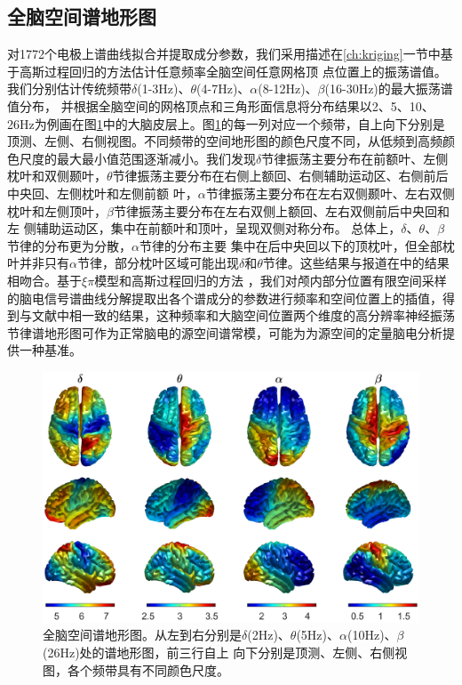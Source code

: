 \subsection{全脑空间谱地形图}
对1772个电极上谱曲线拟合并提取成分参数，我们采用描述在\ref{ch:kriging}一节中基于高斯过程回归的方法估计任意频率全脑空间任意网格顶
点位置上的振荡谱值。我们分别估计传统频带$\delta$(1-3Hz)、$\theta$(4-7Hz)、$\alpha$(8-12Hz)、$\beta$(16-30Hz)的最大振荡谱值分布，
并根据全脑空间的网格顶点和三角形面信息将分布结果以2、5、10、26Hz为例画在图\ref{map}中的大脑皮层上。图\ref{map}的每一列对应一个频带，自上向下分别是顶测、左侧、右侧视图。不同频带的空间地形图的颜色尺度不同，从低频到高频颜色尺度的最大最小值范围逐渐减小。我们发现$\delta$节律振荡主要分布在前额叶、左侧枕叶和双侧颞叶，$\theta$节律振荡主要分布在右侧上额回、右侧辅助运动区、右侧前后中央回、左侧枕叶和左侧前额
叶，$\alpha$节律振荡主要分布在左右双侧颞叶、左右双侧枕叶和左侧顶叶，$\beta$节律振荡主要分布在左右双侧上额回、左右双侧前后中央回和左
侧辅助运动区，集中在前额叶和顶叶，呈现双侧对称分布。 总体上，$\delta$、$\theta$、$\beta$节律的分布更为分散，$\alpha$节律的分布主要
集中在后中央回以下的顶枕叶，但全部枕叶并非只有$\alpha$节律，部分枕叶区域可能出现$\delta$和$\theta$节律。这些结果与报道在\cite{gastaut1949enregistrement,jasper1949electrocorticograms,sem1953depth,chatrian1960depth,sem1956electroencephalographic,perez1962electrographic,graf1984electrocorticography,frauscher2018atlas}中的结果相吻合。基于$\xi\pi$模型和高斯过程回归的方法
，我们对颅内部分位置有限空间采样的脑电信号谱曲线分解提取出各个谱成分的参数进行频率和空间位置上的插值，得到与文献中相一致的结果，这种频率和大脑空间位置两个维度的高分辨率神经振荡节律谱地形图可作为正常脑电的源空间谱常模，可能为为源空间的定量脑电分析提供一种基准。
\begin{figure}[!h]
	\includegraphics[width=15cm]{pic/xipi/map.png}
	\caption{全脑空间谱地形图。从左到右分别是$\delta$(2Hz)、$\theta$(5Hz)、$\alpha$(10Hz)、$\beta$(26Hz)处的谱地形图，前三行自上
	向下分别是顶测、左侧、右侧视图，各个频带具有不同颜色尺度。}
	\label{map}
\end{figure}

